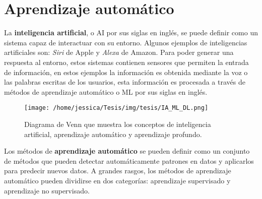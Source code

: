 \chapter{Aprendizaje automático}\label{ch:ML}




La \textbf{inteligencia artificial}, o AI por sus siglas en inglés, se puede definir como un sistema capaz de interactuar con su entorno. Algunos ejemplos de inteligencias artificiales son: \emph{Siri} de Apple y \emph{Alexa} de Amazon. Para poder generar una respuesta al entorno, estos sistemas contienen sensores que permiten la entrada de información, en estos ejemplos la información es obtenida mediante la voz o las palabras escritas de los usuarios, esta información es procesada a través de métodos de aprendizaje automático o ML por sus siglas en inglés.

\begin{figure}[!htbp]
  \centering
  \texttt{[image: /home/jessica/Tesis/img/tesis/IA\_ML\_DL.png]}
  \caption{Diagrama de Venn que muestra los conceptos de inteligencia artificial, aprendizaje automático y aprendizaje profundo.}
  \label{fig:IA-ML-DL}
\end{figure}

Los métodos de \textbf{aprendizaje automático} se pueden definir como un conjunto de métodos que pueden detectar automáticamente patrones en datos y aplicarlos para predecir nuevos datos. A grandes rasgos, los métodos de aprendizaje automático pueden dividirse en dos categorías: aprendizaje supervisado y aprendizaje no supervisado. \cite{murphy:2013}

